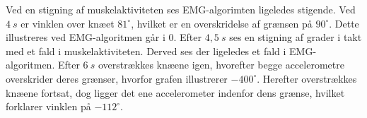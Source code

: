 Ved en stigning af muskelaktiviteten ses EMG-algorimten ligeledes stigende. Ved $4~s$ er vinklen over knæet $81^{\circ}$, hvilket er en overskridelse af grænsen på $90^{\circ}$. Dette illustreres ved EMG-algoritmen går i 0. 
Efter $4,5~s$ ses en stigning af grader i takt med et fald i muskelaktiviteten. Derved ses der ligeledes et fald i EMG-algoritmen. 
Efter $6~s$ overstrækkes knæene igen, hvorefter begge accelerometre overskrider deres grænser, hvorfor grafen illustrerer $-400^{\circ}$. Herefter overstrækkes knæene fortsat, dog ligger det ene accelerometer indenfor dens grænse, hvilket forklarer vinklen på $-112^{\circ}$. 
